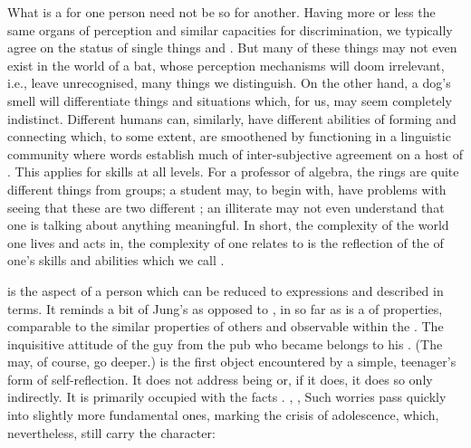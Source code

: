 What is a  for one person need not be so for another. Having more or
less the same organs of perception and similar
capacities for discrimination, we typically agree on the status of single
things and . But many of these things may not even exist
in the world of a bat, whose perception mechanisms will doom irrelevant, i.e., leave
unrecognised, many things we distinguish. On the other hand, a
dog's smell will differentiate things and situations which, for us, may seem
completely indistinct. Different humans can, similarly, have different
abilities of forming and connecting  which, to some extent, are
smoothened by functioning in a linguistic community where words establish much
of inter-subjective agreement on a host of .  This applies for
skills at all levels.  For a professor of algebra, the rings are quite different
things from groups; a student may, to begin with, have problems with seeing that
these are two different ; an illiterate may not even understand
that one is talking about anything meaningful.  In short, the complexity of the
world one lives and acts in, the complexity of  one relates to is
the reflection of the  of one's skills and abilities which we call
.

\pa
{} is the aspect of a person which can be reduced to 
expressions and described in  terms. It reminds a bit of Jung's
 as opposed to , in so far as  is a
 of  properties, comparable to the similar
properties of others and observable within the \hoa. The inquisitive attitude of
the guy from the pub who became  belongs to his
. (The  may, of course, go deeper.) 
 is the first object encountered by a simple, teenager's form of
self-reflection. It does not address being or, if it does, it does so only
indirectly. It is primarily occupied with the facts .
, ,  Such worries pass quickly into slightly more
fundamental ones, marking the crisis of adolescence, which, nevertheless, still
carry the  character:   

